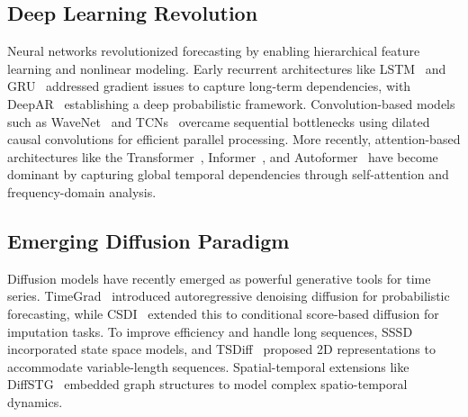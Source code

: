 \subsection{Deep Learning Revolution}
Neural networks revolutionized forecasting by enabling hierarchical feature learning and nonlinear modeling. 
Early recurrent architectures like LSTM~\cite{HSJ1997} and GRU~\cite{2014Learning} addressed gradient issues to capture long-term dependencies, with DeepAR~\cite{2020DeepAR} establishing a deep probabilistic framework. 
Convolution-based models such as WaveNet~\cite{2016WaveNet} and TCNs~\cite{DBLP:conf/iclr/BaiKK19} overcame sequential bottlenecks using dilated causal convolutions for efficient parallel processing. 
More recently, attention-based architectures like the Transformer~\cite{2017Attention}, Informer~\cite{2020Informer}, and Autoformer~\cite{2021Autoformer} have become dominant by capturing global temporal dependencies through self-attention and frequency-domain analysis.

\subsection{Emerging Diffusion Paradigm}
Diffusion models have recently emerged as powerful generative tools for time series.
TimeGrad~\cite{2021Autoregressive} introduced autoregressive denoising diffusion for probabilistic forecasting, while CSDI~\cite{2021CSDI} extended this to conditional score-based diffusion for imputation tasks. 
To improve efficiency and handle long sequences, SSSD~\cite{alcaraz2022diffusion} incorporated state space models, and TSDiff~\cite{kollovieh2023predict} proposed 2D representations to accommodate variable-length sequences. 
Spatial-temporal extensions like DiffSTG~\cite{wen2023DiffSTG} embedded graph structures to model complex spatio-temporal dynamics. 


